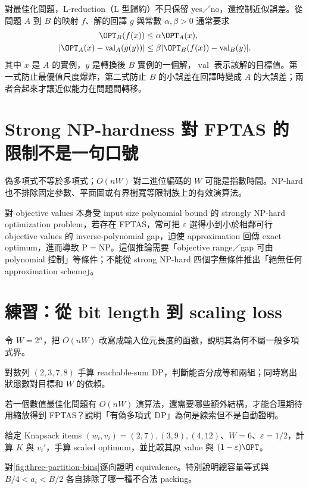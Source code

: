 \documentclass[11pt,a4paper,oneside,openany]{book}
\begin{document}
對最佳化問題，L-reduction（L 型歸約）不只保留 yes／no，還控制近似誤差。從問題 $A$ 到 $B$ 的映射 $f$、解的回譯 $g$ 與常數 $\alpha,\beta>0$ 通常要求
\begin{align*}
 \OPT_B(f(x))&\le \alpha\OPT_A(x),\\
 |\OPT_A(x)-\operatorname{val}_A(g(y))|
 &\le\beta|\OPT_B(f(x))-\operatorname{val}_B(y)|.
\end{align*}
其中 $x$ 是 $A$ 的實例，$y$ 是轉換後 $B$ 實例的一個解，$\operatorname{val}$ 表示該解的目標值。第一式防止最優值尺度爆炸，第二式防止 $B$ 的小誤差在回譯時變成 $A$ 的大誤差；兩者合起來才讓近似能力在問題間轉移。

\section{Strong NP-hardness 對 FPTAS 的限制不是一句口號}
\begin{misconception}
偽多項式不等於多項式；$O(nW)$ 對二進位編碼的 $W$ 可能是指數時間。NP-hard 也不排除固定參數、平面圖或有界樹寬等限制族上的有效演算法。
\end{misconception}

對 objective values 本身受 input size polynomial bound 的 strongly NP-hard optimization problem，若存在 FPTAS，常可把 $\varepsilon$ 選得小到小於相鄰可行 objective values 的 inverse-polynomial gap，迫使 approximation 回傳 exact optimum，進而導致 $\mathrm P=\mathrm{NP}$。這個推論需要「objective range／gap 可由 polynomial 控制」等條件；不能從 strong NP-hard 四個字無條件推出「絕無任何 approximation scheme」。

\section{練習：從 bit length 到 scaling loss}
\begin{exercise}
令 $W=2^n$，把 $O(nW)$ 改寫成輸入位元長度的函數，說明其為何不屬一般多項式界。
\end{exercise}
\begin{exercise}
對數列 $(2,3,7,8)$ 手算 reachable-sum DP，判斷能否分成等和兩組；同時寫出狀態數對目標和 $W$ 的依賴。
\end{exercise}
\begin{exercise}
若一個數值最佳化問題有 $O(nW)$ 演算法，還需要哪些額外結構，才能合理期待用縮放得到 FPTAS？說明「有偽多項式 DP」為何是線索但不是自動證明。
\end{exercise}
\begin{exercise}
給定 Knapsack items $(w_i,v_i)=(2,7),(3,9),(4,12)$、$W=6$、$\varepsilon=1/2$，計算 $K$ 與 $v_i'$，手算 scaled optimum，並比較其原 value 與 $(1-\varepsilon)\OPT$。
\end{exercise}
\begin{exercise}
對\cref{fig:three-partition-bins}逐向證明 equivalence。特別說明總容量等式與 $B/4<a_i<B/2$ 各自排除了哪一種不合法 packing。
\end{exercise}
\end{document}
